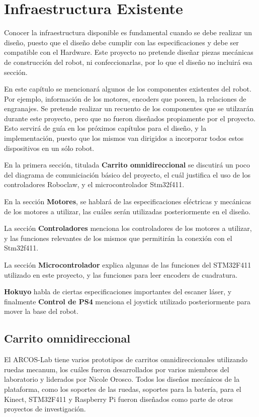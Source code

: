 \chapter{Infraestructura Existente}

Conocer la infraestructura disponible es fundamental cuando se debe realizar un diseño, puesto que el diseño debe cumplir con las especificaciones y debe ser compatible con el Hardware. Este proyecto no pretende diseñar piezas mecánicas de construcción del robot, ni confeccionarlas, por lo que el diseño no incluirá esa sección.

En este capítulo se mencionará algunos de los componentes existentes del robot. Por ejemplo, información de los motores, encoders que poseen, la relaciones de engranajes. Se pretende realizar un recuento de los componentes que se utilzarán durante este proyecto, pero que no fueron diseñados propiamente por el proyecto. Esto servirá de guía en los próximos capítulos para el diseño, y la implementación, puesto que los mismos van dirigidos a incorporar todos estos dispositivos en un sólo robot.

En la primera sección, titulada \textbf{Carrito omnidireccional} se discutirá un poco del diagrama de comuniciación básico del proyecto, el cuál justifica el uso de los controladores Roboclaw, y el microcontrolador Stm32f411.

En la sección \textbf{Motores}, se hablará de las especificaciones eĺéctricas y mecánicas de los motores a utilizar, las cuáles serán utilizadas posteriormente en el diseño.

La sección \textbf{Controladores} menciona los controladores de los motores a utilizar, y las funciones relevantes de los mismos que permitirán la conexión con el Stm32f411.

La sección \textbf{Microcontrolador} explica algunas de las funciones del STM32F411 utilizado en este proyecto, y las funciones para leer encoders de cuadratura.

\textbf{Hokuyo} habla de ciertas especificaciones importantes del escaner láser, y finalmente \textbf{Control de PS4} menciona el joystick utilizado posteriormente para mover la base del robot.

\newpage

\section{Carrito omnidireccional}
El ARCOS-Lab tiene varios prototipos de carritos omnidireccionales utilizando ruedas mecanum, los cuáles fueron desarrollados por varios miembros del laboratorio y liderados por Nicole Orosco. Todos los diseños mecánicos de la plataforma, como los soportes de las ruedas, soportes para la batería, para el Kinect, STM32F411 y Raspberry Pi fueron diseñados como parte de otros proyectos de investigación. 

